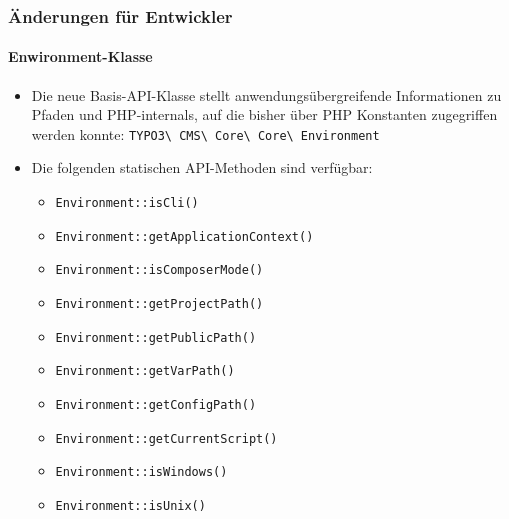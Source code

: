 \begin{frame}[fragile]
	\frametitle{Änderungen für Entwickler}
	\framesubtitle{Enwironment-Klasse}

	\lstset{basicstyle=\tiny\ttfamily}

	\begin{itemize}
		\item Die neue Basis-API-Klasse stellt anwendungsübergreifende Informationen zu Pfaden
			und PHP-internals, auf die bisher über PHP Konstanten zugegriffen werden konnte:
				\small
					\texttt{TYPO3\textbackslash
						CMS\textbackslash
						Core\textbackslash
						Core\textbackslash
						Environment}
				\normalsize

		\item Die folgenden statischen API-Methoden sind verfügbar:

			\begin{itemize}
				\smaller
				\item \texttt{Environment::isCli()}
				\item \texttt{Environment::getApplicationContext()}
				\item \texttt{Environment::isComposerMode()}
				\item \texttt{Environment::getProjectPath()}
				\item \texttt{Environment::getPublicPath()}
				\item \texttt{Environment::getVarPath()}
				\item \texttt{Environment::getConfigPath()}
				\item \texttt{Environment::getCurrentScript()}
				\item \texttt{Environment::isWindows()}
				\item \texttt{Environment::isUnix()}
			\end{itemize}

	\end{itemize}

\end{frame}

